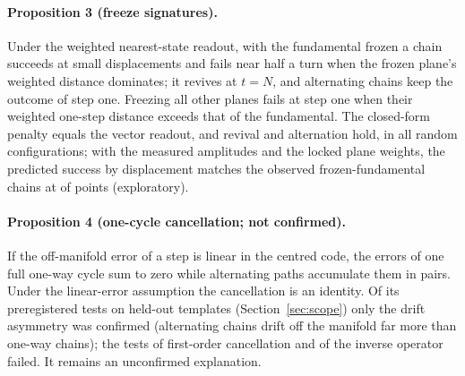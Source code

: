 \paragraph{Proposition 3 (freeze signatures).} Under the weighted nearest-state readout, with the fundamental frozen a chain succeeds
at small displacements and fails near half a turn when the frozen plane's weighted distance dominates; it revives at $t=N$, and
alternating chains keep the outcome of step one. Freezing all other planes fails at step one when their weighted one-step distance
exceeds that of the fundamental. The closed-form penalty equals the vector readout, and revival and alternation hold, in all
\CLtheoryPthreeTrials{} random configurations; with the measured amplitudes and the locked plane weights, the predicted success by
displacement matches the observed frozen-fundamental chains at \CLtheoryTtwoBAgree{} of \CLtheoryTtwoBN{} points (exploratory).

\paragraph{Proposition 4 (one-cycle cancellation; not confirmed).} If the off-manifold error of a step is linear in the centred code,
the errors of one full one-way cycle sum to zero while alternating paths accumulate them in pairs. Under the linear-error assumption the cancellation is an identity. Of its preregistered tests on held-out templates
(Section~\ref{sec:scope}) only the drift asymmetry was confirmed (alternating chains drift off the manifold far more than one-way chains);
the tests of first-order cancellation and of the inverse operator failed. It remains an unconfirmed
explanation. 
